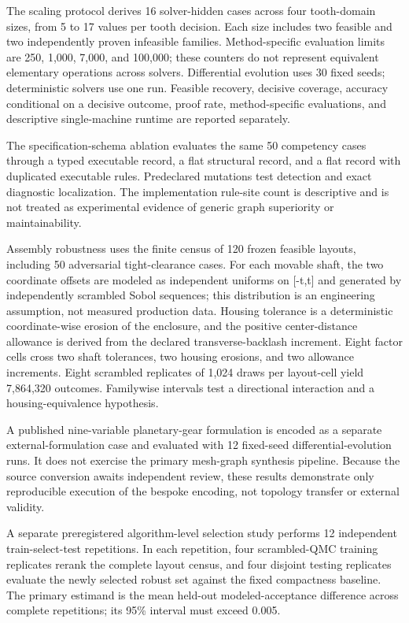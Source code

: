 \documentclass[preprint,12pt]{elsarticle}
\begin{document}
The scaling protocol derives 16 solver-hidden cases across four tooth-domain sizes, from 5 to 17 values per tooth decision. Each size includes two feasible and two independently proven infeasible families. Method-specific evaluation limits are 250, 1,000, 7,000, and 100,000; these counters do not represent equivalent elementary operations across solvers. Differential evolution uses 30 fixed seeds; deterministic solvers use one run. Feasible recovery, decisive coverage, accuracy conditional on a decisive outcome, proof rate, method-specific evaluations, and descriptive single-machine runtime are reported separately.

The specification-schema ablation evaluates the same 50 competency cases through a typed executable record, a flat structural record, and a flat record with duplicated executable rules. Predeclared mutations test detection and exact diagnostic localization. The implementation rule-site count is descriptive and is not treated as experimental evidence of generic graph superiority or maintainability.

Assembly robustness uses the finite census of 120 frozen feasible layouts, including 50 adversarial tight-clearance cases. For each movable shaft, the two coordinate offsets are modeled as independent uniforms on [-t,t] and generated by independently scrambled Sobol sequences; this distribution is an engineering assumption, not measured production data. Housing tolerance is a deterministic coordinate-wise erosion of the enclosure, and the positive center-distance allowance is derived from the declared transverse-backlash increment. Eight factor cells cross two shaft tolerances, two housing erosions, and two allowance increments. Eight scrambled replicates of 1,024 draws per layout-cell yield 7,864,320 outcomes. Familywise intervals test a directional interaction and a housing-equivalence hypothesis.

A published nine-variable planetary-gear formulation is encoded as a separate external-formulation case and evaluated with 12 fixed-seed differential-evolution runs. It does not exercise the primary mesh-graph synthesis pipeline. Because the source conversion awaits independent review, these results demonstrate only reproducible execution of the bespoke encoding, not topology transfer or external validity.

A separate preregistered algorithm-level selection study performs 12 independent train-select-test repetitions. In each repetition, four scrambled-QMC training replicates rerank the complete layout census, and four disjoint testing replicates evaluate the newly selected robust set against the fixed compactness baseline. The primary estimand is the mean held-out modeled-acceptance difference across complete repetitions; its 95\% interval must exceed 0.005.
\end{document}
